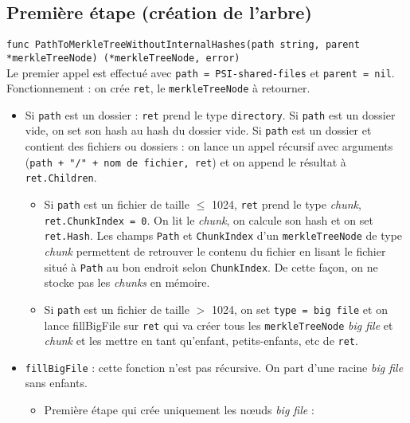 \subsection{Première étape (création de l'arbre)}
\footnotesize\texttt{func PathToMerkleTreeWithoutInternalHashes(path string, parent *merkleTreeNode) (*merkleTreeNode, error)}\\ \normalsize
Le premier appel est effectué avec \texttt{path = PSI-shared-files} et \texttt{parent = nil}.
\\Fonctionnement : on crée \texttt{ret}, le \texttt{merkleTreeNode} à retourner.
\begin{itemize}
    \item Si \texttt{path} est un dossier :
        \texttt{ret} prend le type \texttt{directory}.
        Si \texttt{path} est un dossier vide, on set son hash au hash du dossier vide.
        Si \texttt{path} est un dossier et contient des fichiers ou dossiers : on lance un appel récursif avec arguments (\texttt{path + "/" + nom de fichier, ret}) et on append le résultat à \texttt{ret.Children}.
        \begin{itemize}
            \item Si \texttt{path} est un fichier de taille $\leqslant$ 1024, \texttt{ret} prend le type \textit{chunk}, \texttt{ret.ChunkIndex = 0}. On lit le \textit{chunk}, on calcule son hash et on set \texttt{ret.Hash}. Les champs \texttt{Path} et \texttt{ChunkIndex} d'un \texttt{merkleTreeNode} de type \textit{chunk} permettent de retrouver le contenu du fichier en lisant le fichier situé à \texttt{Path} au bon endroit selon \texttt{ChunkIndex}. De cette façon, on ne stocke pas les \textit{chunks} en mémoire.
            \item Si \texttt{path} est un fichier de taille $>$ 1024, on set \texttt{type = big file} et on lance fillBigFile sur \texttt{ret} qui va créer tous les \texttt{merkleTreeNode} \textit{big file} et \textit{chunk} et les mettre en tant qu'enfant, petits-enfants, etc de \texttt{ret}.
        \end{itemize}
    \item \texttt{fillBigFile} : cette fonction n'est pas récursive. On part d'une racine \textit{big file} sans enfants.
        \begin{itemize}
            \item Première étape qui crée uniquement les nœuds \textit{big file} :

\end{itemize}
\end{itemize}
